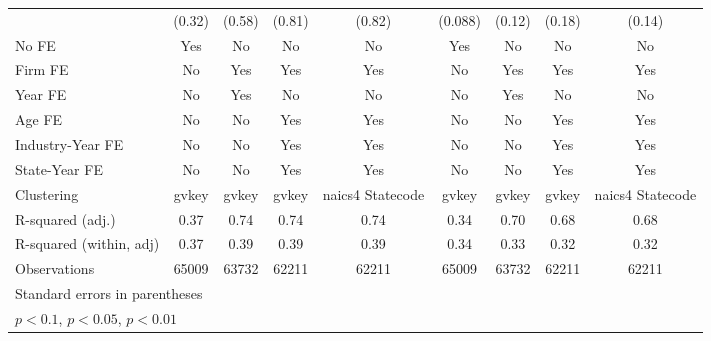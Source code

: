 {\begin{tabular}{l*{8}{c}}
                    &      (0.32)         &      (0.58)         &      (0.81)         &      (0.82)         &     (0.088)         &      (0.12)         &      (0.18)         &      (0.14)         \\
\addlinespace
No FE               &         Yes         &          No         &          No         &          No         &         Yes         &          No         &          No         &          No         \\
\addlinespace
Firm FE             &          No         &         Yes         &         Yes         &         Yes         &          No         &         Yes         &         Yes         &         Yes         \\
\addlinespace
Year FE             &          No         &         Yes         &          No         &          No         &          No         &         Yes         &          No         &          No         \\
\addlinespace
Age FE              &          No         &          No         &         Yes         &         Yes         &          No         &          No         &         Yes         &         Yes         \\
\addlinespace
Industry-Year FE    &          No         &          No         &         Yes         &         Yes         &          No         &          No         &         Yes         &         Yes         \\
\addlinespace
State-Year FE       &          No         &          No         &         Yes         &         Yes         &          No         &          No         &         Yes         &         Yes         \\
\midrule
Clustering          &       gvkey         &       gvkey         &       gvkey         &naics4 Statecode         &       gvkey         &       gvkey         &       gvkey         &naics4 Statecode         \\
R-squared (adj.)    &        0.37         &        0.74         &        0.74         &        0.74         &        0.34         &        0.70         &        0.68         &        0.68         \\
R-squared (within, adj)&        0.37         &        0.39         &        0.39         &        0.39         &        0.34         &        0.33         &        0.32         &        0.32         \\
Observations        &       65009         &       63732         &       62211         &       62211         &       65009         &       63732         &       62211         &       62211         \\
\bottomrule
\multicolumn{9}{l}{\footnotesize Standard errors in parentheses}\\
\multicolumn{9}{l}{\footnotesize \sym{*} \(p<0.1\), \sym{**} \(p<0.05\), \sym{***} \(p<0.01\)}\\
\end{tabular}
}
